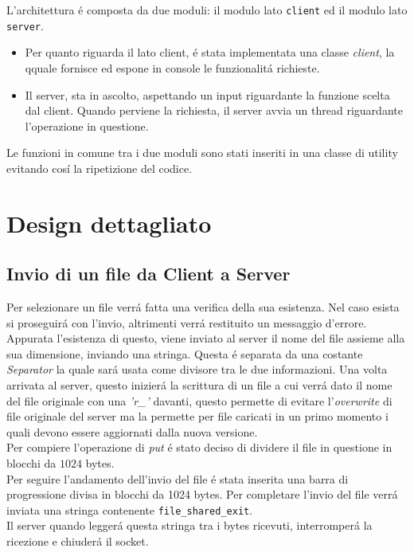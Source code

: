 \documentclass[a4paper, 12pt]{report}
\begin{document}
L'architettura é composta da due moduli: il modulo lato \texttt{client} ed il modulo lato \texttt{server}.
\begin{itemize}
    \item Per quanto riguarda il lato client, é stata implementata una classe \emph{client}, la qquale fornisce ed espone
    in console le funzionalitá richieste.
    \item Il server, sta in ascolto, aspettando un input riguardante la funzione scelta dal client.
    Quando perviene la richiesta, il server avvia un thread riguardante l'operazione in questione.
\end{itemize}
Le funzioni in comune tra i due moduli sono stati inseriti in una classe di utility evitando cosí la ripetizione del codice.

\section{Design dettagliato}
\subsection{Invio di un file da Client a Server}
Per selezionare un file verrá fatta una verifica della sua esistenza. Nel caso esista si proseguirá
con l'invio, altrimenti verrá restituito un messaggio d'errore. Appurata l'esistenza di questo, viene inviato
al server il nome del file assieme alla sua dimensione, inviando una stringa. Questa é separata da una costante \emph{Separator}
la quale sará usata come divisore tra le due informazioni. Una volta arrivata al server, questo inizierá la scrittura
di un file a cui verrá dato il nome del file originale con una \emph{'r\_'} davanti, questo permette di evitare l'\emph{overwrite} di file
originale del server ma la permette per file caricati in un primo momento i quali devono essere aggiornati dalla nuova versione.
\\
Per compiere l'operazione di \emph{put} é stato deciso di dividere il file in questione in blocchi da \(1024\) bytes.
\\
Per seguire l'andamento dell'invio del file é stata inserita una barra di progressione divisa in blocchi da 1024 bytes.
Per completare l'invio del file verrá inviata una stringa contenente \texttt{file\_shared\_exit}.
\\
Il server quando leggerá questa stringa tra i bytes ricevuti, interromperá la ricezione e chiuderá il socket.
\end{document}

